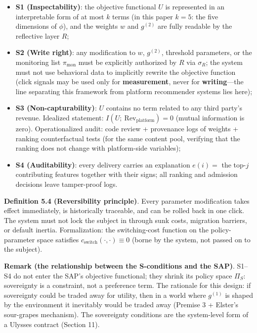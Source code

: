 \documentclass[
  11pt]{article}
\providecommand{\tightlist}{%
  \setlength{\itemsep}{0pt}\setlength{\parskip}{0pt}}
\begin{document}
\begin{itemize}
\tightlist
\item
  \textbf{S1 (Inspectability)}: the objective functional \(U\) is
  represented in an interpretable form of at most \(k\) terms (in this
  paper \(k = 5\): the five dimensions of \(\phi\)), and the weights
  \(w\) and \(g^{(2)}\) are fully readable by the reflective layer
  \(R\);
\item
  \textbf{S2 (Write right)}: any modification to \(w\), \(g^{(2)}\),
  threshold parameters, or the monitoring list \(\pi_{\mathrm{mon}}\)
  must be explicitly authorized by \(R\) via \(\sigma_R\); the system
  must not use behavioral data to implicitly rewrite the objective
  function (click signals may be used only for \textbf{measurement},
  never for \textbf{writing}---the line separating this framework from
  platform recommender systems lies here);
\item
  \textbf{S3 (Non-capturability)}: \(U\) contains no term related to any
  third party's revenue. Idealized statement:
  \(I(U;\ \mathrm{Rev}_{\mathrm{platform}}) = 0\) (mutual information is
  zero). Operationalized audit: code review + provenance logs of weights
  + ranking counterfactual tests (for the same content pool, verifying
  that the ranking does not change with platform-side variables);
\item
  \textbf{S4 (Auditability)}: every delivery carries an explanation
  \(e(i) =\) the top-\(j\) contributing features together with their
  signs; all ranking and admission decisions leave tamper-proof logs.
\end{itemize}

\textbf{Definition 5.4 (Reversibility principle)}. Every parameter
modification takes effect immediately, is historically traceable, and
can be rolled back in one click. The system must not lock the subject in
through sunk costs, migration barriers, or default inertia.
Formalization: the switching-cost function on the policy-parameter space
satisfies \(c_{\mathrm{switch}}(\cdot,\cdot) \equiv 0\) (borne by the
system, not passed on to the subject).

\textbf{Remark (the relationship between the S-conditions and the SAP)}.
S1--S4 do not enter the SAP's objective functional; they shrink its
policy space \(\Pi_S\): sovereignty is a constraint, not a preference
term. The rationale for this design: if sovereignty could be traded away
for utility, then in a world where \(g^{(1)}\) is shaped by the
environment it inevitably would be traded away (Premise 3 + Elster's
sour-grapes mechanism). The sovereignty conditions are the system-level
form of a Ulysses contract (Section 11).
\end{document}
